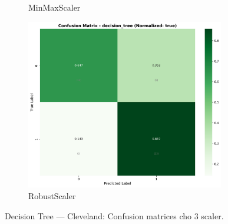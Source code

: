 \begin{figure}[H]
\begin{subfigure}[b]{0.31\textwidth}
\caption{MinMaxScaler}\label{fig:dt_clev_cm_minmax}
\end{subfigure}\hfill
\begin{subfigure}[b]{0.31\textwidth}\centering
\includegraphics[width=0.95\textwidth]{Result/cleveland_dataset/confusion_matrices/decision_tree_numeric_dataset_RobustScaler.png}
\caption{RobustScaler}\label{fig:dt_clev_cm_robust}
\end{subfigure}
\caption{Decision Tree — Cleveland: Confusion matrices cho 3 scaler.}
\label{fig:dt_clev_confusions}
\end{figure}

